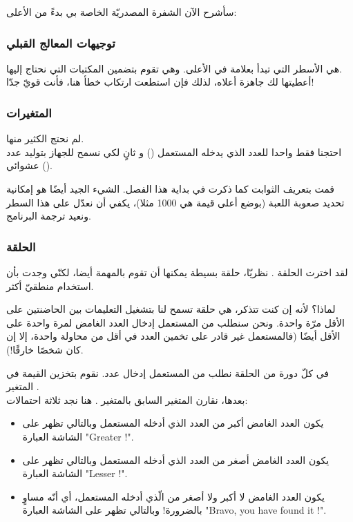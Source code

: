 سأشرح الآن الشفرة المصدريّة الخاصة بي بدءً من الأعلى:

\subsubsection{توجيهات المعالج القبلي}

هي الأسطر التي تبدأ بعلامة
\InlineCode{\#}
في الأعلى. وهي تقوم بتضمين المكتبات التي نحتاج إليها.\\
أعطيتها لك جاهزة أعلاه، لذلك فإن استطعت ارتكاب خطأ هنا، فأنت قويّ جدّا!

\subsubsection{المتغيرات}

لم نحتج الكثير منها.\\
احتجنا فقط واحدا للعدد الذي يدخله المستعمل
() 
و ثانٍ لكي نسمح للجهاز بتوليد عدد عشوائي 
().

قمت بتعريف الثوابت كما ذكرت في بداية هذا الفصل. الشيء الجيد أيضًا هو إمكانية تحديد صعوبة اللعبة (بوضع أعلى قيمة هي 1000 مثلا)، يكفي أن نعدّل على هذا السطر ونعيد ترجمة البرنامج.

\subsubsection{الحلقة}

لقد اخترت الحلقة
.
نظريّا، حلقة
بسيطة يمكنها أن تقوم بالمهمة أيضا، لكنّي وجدت بأن استخدام 
منطقيّ أكثر. 

لماذا؟  لأنه إن كنت تتذكر، 
هي حلقة تسمح لنا بتشغيل التعليمات بين الحاضنتين على الأقل مرّة واحدة. ونحن سنطلب من المستعمل إدخال العدد الغامض لمرة واحدة على الأقل أيضًا (فالمستعمل غير قادر على تخمين العدد في أقل من محاولة واحدة، إلا إن كان شخصًا خارقًا!).

في كلّ دورة من الحلقة نطلب من المستعمل إدخال عدد. نقوم بتخزين القيمة في المتغير 
.\\
بعدها، نقارن المتغير السابق بالمتغير 
.
هنا نجد ثلاثة احتمالات:

\begin{itemize}
	\item يكون العدد الغامض أكبر من العدد الذي أدخله المستعمل وبالتالي تظهر على الشاشة العبارة
	"\textenglish{Greater !}".
	\item يكون العدد الغامض أصغر من العدد الذي أدخله المستعمل وبالتالي تظهر على الشاشة العبارة
	"\textenglish{Lesser !}".
	\item يكون العدد الغامض لا أكبر ولا أصغر من الّذي أدخله المستعمل، أي أنّه مساوٍ بالضرورة! وبالتالي تظهر على الشاشة العبارة
	"\textenglish{Bravo, you have found it !}".
\end{itemize}

